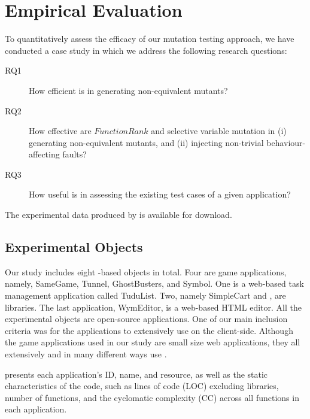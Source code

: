 \section{Empirical Evaluation} \label{Sec:evaluation}

To quantitatively assess the efficacy of our mutation testing approach, we have conducted a case study in which we address the following research questions:

\begin{description}
\item [RQ1] How efficient is \mutandis in generating non-equivalent mutants?
\item [RQ2] How effective are $FunctionRank$ and selective variable mutation in (i) generating non-equivalent mutants, and (ii) injecting non-trivial behaviour-affecting faults?
\item [RQ3] How useful is \mutandis in assessing the existing test cases of a given application?

\end{description} 

The experimental data produced by \mutandis is available for download.




\subsection{Experimental Objects}
Our study includes eight \javascript-based objects in total. Four
are game applications, namely, SameGame, Tunnel, GhostBusters, and Symbol. One is  a web-based task management application called TuduList. Two, namely SimpleCart and \jquery, are \javascript libraries. The last application, WymEditor, is a web-based HTML editor. All the experimental objects are open-source applications.
One of our main inclusion criteria was for the applications to extensively use \javascript on the client-side.
Although the game applications used in our study are small size web applications, they all extensively and in many different ways use \javascript.

%
 presents each application's ID, name, and resource, as well as the static  characteristics of the \javascript code, such as \javascript lines of code (LOC) excluding libraries, number of functions, and the cyclomatic complexity (CC) across all \javascript functions in each application.

